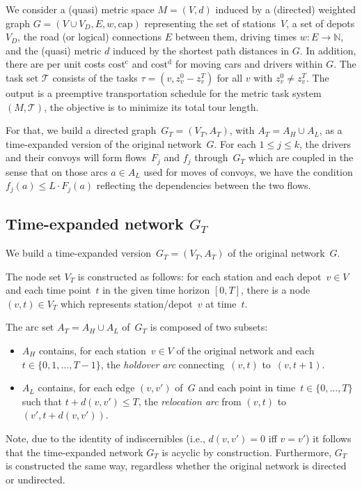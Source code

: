 \documentclass[english]{llncs}
\numberwithin{sublemma}{lemma}
\newcommand{\NN}{\ensuremath{\mathbb{N}}}
\newcommand{\capd}{\ensuremath{L}}
\newcommand{\dist}{\ensuremath{d}}
\newcommand{\costd}{\ensuremath{\text{cost}^{\text{d}}}}
\newcommand{\costc}{\ensuremath{\text{cost}^{\text{c}}}}
\newcommand{\fc}{\ensuremath{f}}
\newcommand{\fd}{\ensuremath{F}}
\newcommand{\T}{\ensuremath{\mathcal{T}}}
\newcommand{\capacity}{\ensuremath{\text{cap}}}
\newcommand{\VD}{V_D}
\begin{document}
We consider a (quasi) metric space $M = (V, \dist)$ induced by a (directed) weighted graph $G=(V \cup \VD, E, w, \capacity)$ representing the set of stations~$V$, a set of depots $\VD$,
the road (or logical) connections $E$ between them, driving times $w \colon E \to \NN$, and the (quasi) metric $\dist$ induced by the shortest path distances in $G$. 
In addition, there are per unit costs $\costc$ and $\costd$ for moving cars and drivers within $G$. 
The task set ${\T}$ consists of the tasks $\tau = (v, z_v^0-z_v^T)$ for all $v$ with $z_v^0 \neq z_v^T$. 
The output is a preemptive transportation schedule for the metric task system $(M, {\T})$, the objective is to minimize its total tour length.

For that, we build a directed graph~$G_T = (V_T, A_T)$, with $A_T = A_H \cup A_L$, as a time-expanded version of the original network~$G$. 
For each $1 \leq j \leq k$, the drivers and their convoys will form flows~$\fd_j$ and $\fc_j$ through~$G_T$ which are coupled in the sense that on those arcs $a \in A_L$ used for moves of convoys,
we have the condition $\fc_j(a)\leq \capd \cdot \fd_j(a)$ reflecting the dependencies between the two flows.


\subsection{Time-expanded network \texorpdfstring{$G_T$}{GT}}
\label{sec: static: min-cost flows: ten: wo pre w back}


We build a time-expanded version~$G_T = (V_T, A_T)$ of the original network~$G$.

The node set $V_T$ is constructed as follows: 
for each station and each depot~$v \in V$ and each time point~$t$ in the given time horizon $[0, T]$, there is a node $(v,t) \in V_T$ which represents station/depot~$v$ at time~$t$.

The arc set $A_T = A_H \cup A_L$ of~$G_T$ is composed of two subsets:
\begin{itemize}
\item $A_H$ contains, for each station~$v \in V$ of the original network and each $t \in \{ 0, 1, \dotsc, T-1 \} $, the \emph{holdover arc} connecting~$(v,t)$ to~$(v,t+1)$. 
\item $A_L$ contains, for each edge $(v,v')$ of~$G$ and each point in time~$t \in \{ 0, \dotsc, T \}$ such that $t + \dist(v,v') \leq T$, the \emph{relocation arc} from $(v,t)$ to $(v',t + \dist(v,v'))$.
\end{itemize}
Note, due to the identity of indiscernibles (i.e., $d(v,v') = 0$ iff $v = v'$) it follows that the time-expanded network $G_T$ is acyclic by construction.
Furthermore, $G_T$ is constructed the same way, regardless whether the original network is directed or undirected.
\end{document}
